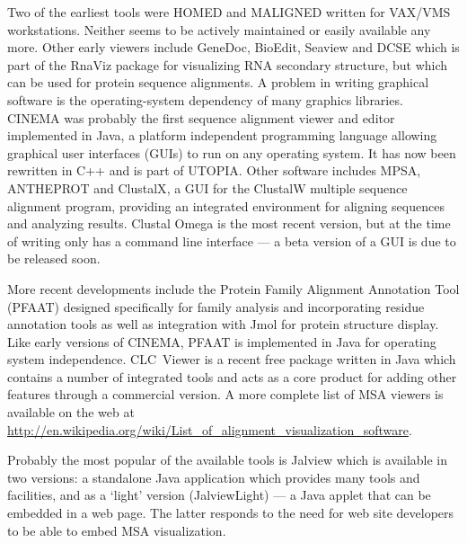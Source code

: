 \documentclass[10pt,a4paper,twocolumn]{article}
\begin{document}
Two of the earliest tools were HOMED\cite{stockwell:homed} and
MALIGNED\cite{clark:maligned} written for VAX/VMS workstations.
Neither seems to be actively maintained or easily available any
more. Other early viewers include GeneDoc\cite{nicholas:genedoc},
BioEdit, Seaview\cite{galtier:seaview} and DCSE\cite{derijk:dcse}
which is part of the RnaViz package for visualizing RNA secondary
structure\cite{derijk:rnaviz}, but which can be used for protein
sequence alignments.  A problem in writing graphical software is the
operating-system dependency of many graphics libraries.
CINEMA\cite{parrysmith:cinema} was probably the first sequence
alignment viewer and editor implemented in Java, a platform
independent programming language allowing graphical user interfaces
(GUIs) to run on any operating system. It has now been rewritten in
C++ and is part of UTOPIA\cite{pettifer:utopia}. Other software
includes MPSA\cite{blanchet:mpsa}, ANTHEPROT\cite{deleage:antheprot}
and ClustalX\cite{thompson:clustalx}, a GUI for the ClustalW multiple
sequence alignment program, providing an integrated environment for
aligning sequences and analyzing results. Clustal Omega is the most
recent version, but at the time of writing only has a command line
interface --- a beta version of a GUI is due to be released soon.

More recent developments include the Protein Family Alignment
Annotation Tool (PFAAT)\cite{johnson:pfaat} designed specifically for
family analysis and incorporating residue annotation tools as well as
integration with Jmol for protein structure display. Like early
versions of CINEMA, PFAAT is implemented in Java for operating system
independence. CLC~Viewer is a recent free package written in Java
which contains a number of integrated tools and acts as a core product
for adding other features through a commercial version.  A more
complete list of MSA viewers is available on the web at
\url{http://en.wikipedia.org/wiki/List_of_alignment_visualization_software}.

Probably the most popular of the available tools is
Jalview\cite{clamp:jalview} which is available in two versions: a
standalone Java application which provides many tools and facilities,
and as a `light' version (JalviewLight) --- a Java applet that can be
embedded in a web page. The latter responds to the need for web site
developers to be able to embed MSA visualization.
\end{document}
